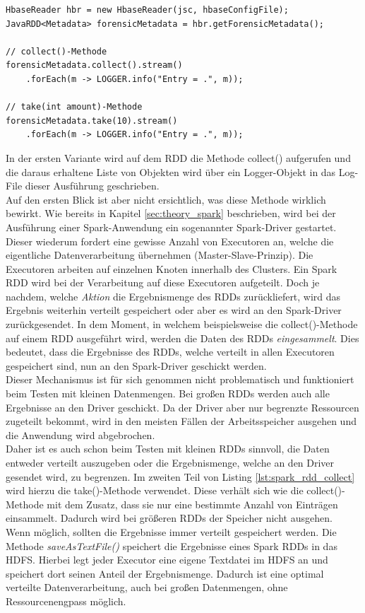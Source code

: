 \begin{lstlisting}[label={lst:spark_rdd_collect},caption= Anzeige der Ergebnisse eines Spark RDDs ,captionpos=b,frame=single,style=customjava]
HbaseReader hbr = new HbaseReader(jsc, hbaseConfigFile);
JavaRDD<Metadata> forensicMetadata = hbr.getForensicMetadata();

// collect()-Methode
forensicMetadata.collect().stream()
	.forEach(m -> LOGGER.info("Entry = .", m));

// take(int amount)-Methode	
forensicMetadata.take(10).stream()
	.forEach(m -> LOGGER.info("Entry = .", m));	
\end{lstlisting}

\noindent
In der ersten Variante wird auf dem RDD die Methode collect() aufgerufen und die daraus erhaltene Liste von Objekten wird über ein Logger-Objekt in das Log-File dieser Ausführung geschrieben.\\
Auf den ersten Blick ist aber nicht ersichtlich, was diese Methode wirklich bewirkt. Wie bereits in Kapitel \ref{sec:theory_spark} beschrieben, wird bei der Ausführung einer Spark-Anwendung ein sogenannter Spark-Driver gestartet. Dieser wiederum fordert eine gewisse Anzahl von Executoren an, welche die eigentliche Datenverarbeitung übernehmen (Master-Slave-Prinzip). Die Executoren arbeiten auf einzelnen Knoten innerhalb des Clusters. 
Ein Spark RDD wird bei der Verarbeitung auf diese Executoren aufgeteilt. Doch je nachdem, welche \textit{Aktion} die Ergebnismenge des RDDs zurückliefert, wird das Ergebnis weiterhin verteilt gespeichert oder aber es wird an den Spark-Driver zurückgesendet. In dem Moment, in welchem beispielsweise die collect()-Methode auf einem RDD ausgeführt wird, werden die Daten des RDDs \textit{eingesammelt}. 
Dies bedeutet, dass die Ergebnisse des RDDs, welche verteilt in allen Executoren gespeichert sind, nun an den Spark-Driver geschickt werden.\\
Dieser Mechanismus ist für sich genommen nicht problematisch und funktioniert beim Testen mit kleinen Datenmengen. Bei großen RDDs werden auch alle Ergebnisse an den Driver geschickt. Da der Driver aber nur begrenzte Ressourcen zugeteilt bekommt, wird in den meisten Fällen der Arbeitsspeicher ausgehen und die Anwendung wird abgebrochen.\\
Daher ist es auch schon beim Testen mit kleinen RDDs sinnvoll, die Daten entweder verteilt auszugeben oder die Ergebnismenge, welche an den Driver gesendet wird, zu begrenzen. Im zweiten Teil von Listing \ref{lst:spark_rdd_collect}  wird hierzu die take()-Methode verwendet. Diese verhält sich wie  die collect()-Methode mit dem Zusatz, dass sie nur eine bestimmte Anzahl von Einträgen einsammelt. Dadurch wird bei größeren RDDs der Speicher nicht ausgehen.\\
Wenn möglich, sollten die Ergebnisse immer verteilt gespeichert werden. Die Methode \textit{saveAsTextFile()} speichert die Ergebnisse eines Spark RDDs in das HDFS. Hierbei legt jeder Executor eine eigene Textdatei im HDFS an und speichert dort seinen Anteil der Ergebnismenge. Dadurch ist eine optimal verteilte Datenverarbeitung, auch bei großen Datenmengen, ohne Ressourcenengpass möglich. 


